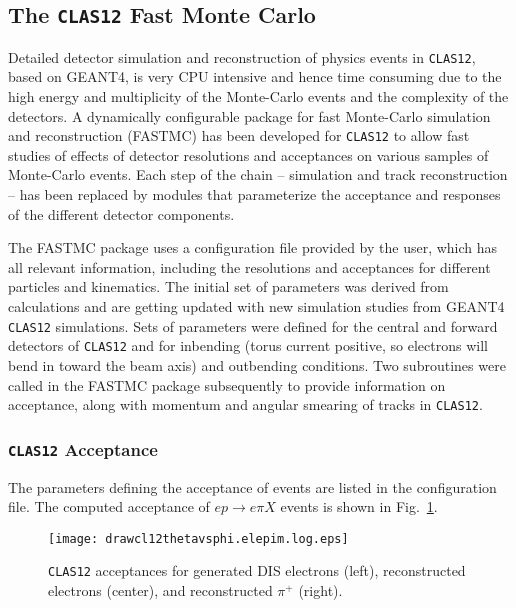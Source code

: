 \subsection{The {\tt CLAS12} Fast Monte Carlo}

Detailed detector simulation and reconstruction of physics events in 
{\tt CLAS12}, based on GEANT4, is very CPU intensive and hence time 
consuming due to the high energy and multiplicity of the Monte-Carlo events 
and the complexity of the detectors.  A dynamically configurable package for
fast Monte-Carlo simulation and reconstruction (FASTMC) has been developed 
for {\tt CLAS12} to allow fast studies of effects of detector resolutions 
and acceptances on various samples of Monte-Carlo events.  Each step of the 
chain -- simulation and track reconstruction -- has been replaced by modules 
that parameterize the acceptance and responses of the different detector 
components.

The FASTMC package uses a configuration file provided by the user, which 
has all relevant information, including the resolutions and acceptances for 
different particles and kinematics.  The initial set of parameters was 
derived from calculations and are getting updated with new simulation 
studies from GEANT4 {\tt CLAS12} simulations.  Sets of parameters were 
defined for the central and forward detectors of {\tt CLAS12} and for inbending
(torus current positive, so electrons will bend in toward the beam axis) 
and outbending conditions.  Two subroutines were called in the FASTMC package 
subsequently to provide information on acceptance, along with momentum 
and angular smearing of tracks in {\tt CLAS12}. 

\subsubsection{{\tt CLAS12} Acceptance}

The parameters defining the acceptance of events are listed in the 
configuration file.  The computed acceptance of $ep \to e\pi X$ events is 
shown in Fig.~\ref{fig:accept}.

\begin{figure}[htbp]
\centering
\texttt{[image: drawcl12thetavsphi.elepim.log.eps]} 
\caption{\small{{\tt CLAS12} acceptances for generated DIS electrons (left), 
reconstructed electrons (center), and reconstructed $\pi^+$ (right).}}
\label{fig:accept}
\end{figure}

